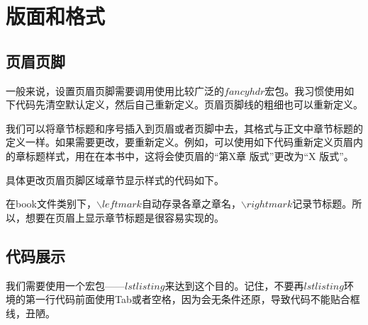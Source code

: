 \newpage

{\let\clearpage\relax \chapter{版面和格式}}

\section{页眉页脚}
一般来说，设置页眉页脚需要调用使用比较广泛的$ fancyhdr $宏包。我习惯使用如下代码先清空默认定义，然后自己重新定义。页眉页脚线的粗细也可以重新定义。

\begin{latex}{}
\usepackage{fancyhdr}
\pagestyle{fancy}
\fancyhf{}					%
	\lhead{}				%
	\cfoot{}
	\fancyhead[RO,LE]{}		%
	\fancyfoot[LE,RO]{\thepage}
\renewcommand{\headrulewidth}{0.4 pt}
\renewcommand{\footrulewidth}{0.4 pt}
\end{latex}


我们可以将章节标题和序号插入到页眉或者页脚中去，其格式与正文中章节标题的定义一样。如果需要更改，要重新定义。例如，可以使用如下代码重新定义页眉内的章标题样式，用在在本书中，这将会使页眉的“第X章 版式”更改为“X 版式”。 

具体更改页眉页脚区域章节显示样式的代码如下。

\begin{latex}{}
\renewcommand{\chaptermark}[1]{\markleft{\thesection.\#1}}
\renewcommand{\chaptermark}[1]{\markboth{\thechapter.\ #1}{节样式空置表示修改章样式}}
\renewcommand{\chaptermark}[1]{\markboth{章样式}{节样式}}
\end{latex}


在book文件类别下，$ \backslash leftmark $自动存录各章之章名，$ \backslash rightmark $记录节标题。所以，想要在页眉上显示章节标题是很容易实现的。


\begin{latex}{}
\lhead{\leftmark}			%
\rhead{\rightmark}			%
\end{latex}


\section{代码展示}
我们需要使用一个宏包——$ lstlisting $来达到这个目的。记住，不要再$ lstlisting $环境的第一行代码前面使用Tab或者空格，因为会无条件还原，导致代码不能贴合框线，丑陋。

